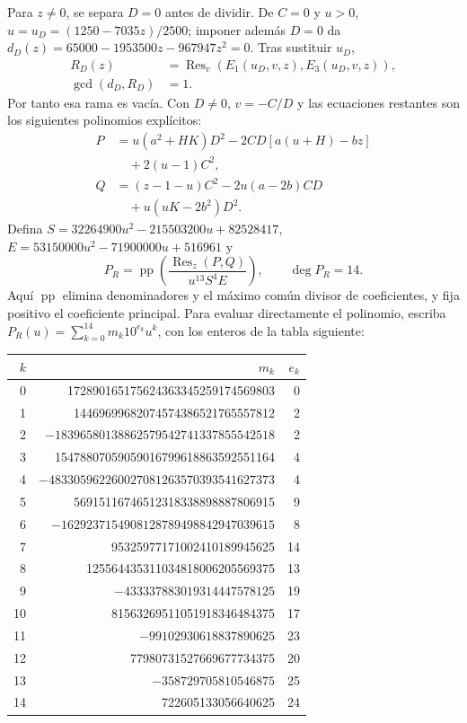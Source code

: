Para $z\ne0$, se separa $D=0$ antes de dividir. De $C=0$ y $u>0$,
$u=u_D=(1250-7035z)/2500$; imponer además $D=0$ da
$d_D(z)=65000-1953500z-967947z^2=0$. Tras sustituir $u_D$,
\begin{equation}
 \begin{aligned}
 R_D(z)&=\operatorname{Res}_v(E_1(u_D,v,z),E_3(u_D,v,z)),\\
 \gcd(d_D,R_D)&=1.
 \end{aligned}
 \label{bre:geo:rf-exception}
\end{equation}
Por tanto esa rama es vacía. Con $D\ne0$, $v=-C/D$ y las ecuaciones
restantes son los siguientes polinomios explícitos:
\begin{equation}
 \begin{aligned}
 P&=u(a^2+HK)D^2-2CD[a(u+H)-bz]\\
  &\quad+2(u-1)C^2,\\
 Q&=(z-1-u)C^2-2u(a-2b)CD\\
  &\quad+u(uK-2b^2)D^2.
 \end{aligned}
 \label{bre:geo:rf-PQ}
\end{equation}
Defina $S=32264900u^2-215503200u+82528417$,
$E=53150000u^2-71900000u+516961$ y
\begin{equation}
 P_R=\operatorname{pp}\left(
 \frac{\operatorname{Res}_z(P,Q)}{u^{13}S^4E}\right),\qquad\deg P_R=14.
 \label{bre:geo:rf-eliminant}
\end{equation}
Aquí $\operatorname{pp}$ elimina denominadores y el máximo común divisor
de coeficientes, y fija positivo el coeficiente principal. Para evaluar
directamente el polinomio, escriba $P_R(u)=\sum_{k=0}^{14}m_k10^{e_k}u^k$,
con los enteros de la tabla siguiente:
\begin{center}
\footnotesize
\begin{tabular}{@{}rrr@{}}
\hline
$k$&$m_k$&$e_k$\\\hline
0&172890165175624363345259174569803&0\\
1&14469699682074574386521765557812&2\\
2&$-18396580138862579542741337855542518$&2\\
3&15478807059059016799618863592551164&4\\
4&$-483305962260027081263570393541627373$&4\\
5&56915116746512318338898887806915&9\\
6&$-1629237154908128789498842947039615$&8\\
7&95325977171002410189945625&14\\
8&125564435311034818006205569375&13\\
9&$-433337883019314447578125$&19\\
10&81563269511051918346484375&17\\
11&$-99102930618837890625$&23\\
12&77980731527669677734375&20\\
13&$-358729705810546875$&25\\
14&722605133056640625&24\\\hline
\end{tabular}
\end{center}
